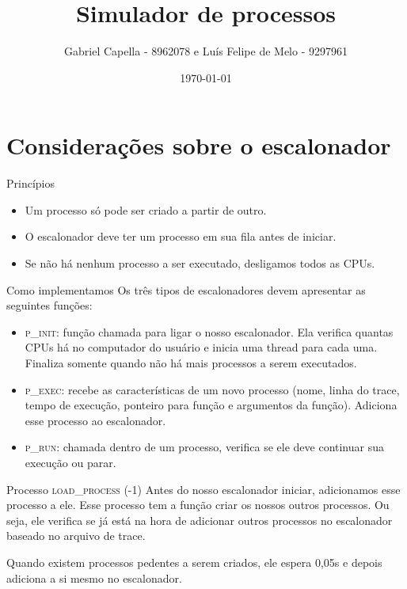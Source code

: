 \documentclass{beamer}
\title{Simulador de processos}
\date{\today}
\author{Gabriel Capella - 8962078 e Luís Felipe de Melo - 9297961}
\institute{Centre for Modern Beamer Themes}
\begin{document}
\maketitle

\section{Considerações sobre o escalonador}
\begin{frame}{Princípios}
	\begin{itemize}
		\item Um processo só pode ser criado a partir de outro.
		\item O escalonador deve ter um processo em sua fila antes de iniciar.
		\item Se não há nenhum processo a ser executado, desligamos todos as CPUs.
	\end{itemize}
\end{frame}


\begin{frame}{Como implementamos}
	Os três tipos de escalonadores devem apresentar as seguintes funções:
	\begin{itemize}
		\item \textsc{p\_init}: função chamada para ligar o nosso escalonador. Ela verifica quantas CPUs há no computador do usuário e inicia uma thread para cada uma. Finaliza somente quando não há mais processos a serem executados.
		\item \textsc{p\_exec}: recebe as características de um novo processo (nome, linha do trace, tempo de execução, ponteiro para função e argumentos da função). Adiciona esse processo ao escalonador.
		\item \textsc{p\_run}: chamada dentro de um processo, verifica se ele deve continuar sua execução ou parar.
	\end{itemize}
\end{frame}


\begin{frame}{Processo \textsc{load\_process} (-1)}
	\justifying
	Antes do nosso escalonador iniciar, adicionamos esse processo a ele. Esse processo tem a função criar os nossos outros processos. Ou seja, ele verifica se já está na hora de adicionar outros processos no escalonador baseado no arquivo de trace. 
	
	Quando existem processos pedentes a serem criados, ele espera 0,05s e depois adiciona a si mesmo no escalonador. 
\end{frame}
\end{document}

